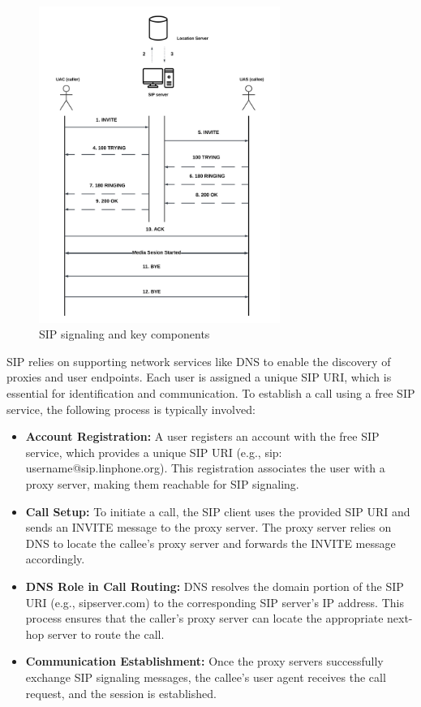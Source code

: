     \begin{figure}[H]
        \centering
        \includegraphics[width=0.7\textwidth]{image/Call Initiation.png} 
        \caption{SIP signaling and key components}
        \label{fig:sip_signaling}
    \end{figure}
    
    SIP relies on supporting network services like DNS to enable the discovery of proxies and user endpoints. 
    Each user is assigned a unique SIP URI, which is essential for identification and communication. 
    To establish a call using a free SIP service, the following process is typically involved:

    \begin{itemize}
        \item \textbf{Account Registration:} A user registers an account with the free SIP service, which provides a unique SIP URI (e.g., sip: username@sip.linphone.org). 
        This registration associates the user with a proxy server, making them reachable for SIP signaling.
        \item \textbf{Call Setup:} To initiate a call, the SIP client uses the provided SIP URI and sends an INVITE message to the proxy server. 
        The proxy server relies on DNS to locate the callee's proxy server and forwards the INVITE message accordingly.
        \item \textbf{DNS Role in Call Routing:} DNS resolves the domain portion of the SIP URI (e.g., sipserver.com) to the corresponding SIP server's IP address. 
        This process ensures that the caller's proxy server can locate the appropriate next-hop server to route the call.
        \item \textbf{Communication Establishment:}  Once the proxy servers successfully exchange SIP signaling messages, the callee's user agent receives the call request, and the session is established.
    \end{itemize}

